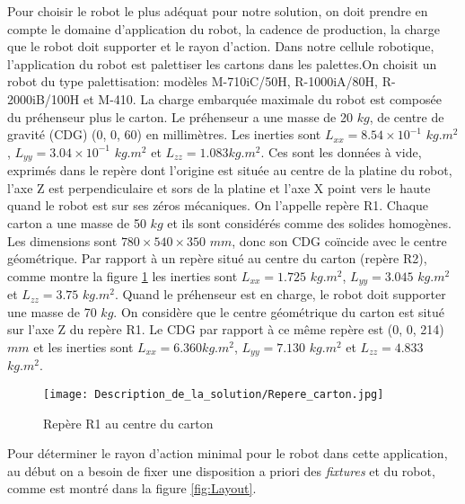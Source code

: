 \vspace{-6pt}


Pour choisir le robot le plus adéquat pour notre solution, on doit prendre en compte le domaine d’application du robot, la cadence de production, la charge que le robot doit supporter et le rayon d’action.
Dans notre cellule robotique, l’application du robot est palettiser les cartons dans les palettes.On choisit un robot du type palettisation: modèles M-710iC/50H, R-1000iA/80H, R-2000iB/100H et M-410.
La charge embarquée maximale du robot est composée du préhenseur plus le carton. Le préhenseur a une masse de 20 $ kg $, de centre de gravité (CDG) (0, 0, 60) en millimètres. Les inerties sont $ L_{xx} = 8.54 \times 10^{-1}$  $ kg.m^2 $, $ L_{yy} = 3.04 \times 10^{-1}$  $ kg.m^2 $ et $ L_{zz} = 1.083 kg.m^2 $. Ces sont les données à vide, exprimés dans le repère dont l'origine est située au centre de la platine du robot, l’axe Z est perpendiculaire et sors de la platine et l’axe X point vers le haute quand le robot est sur ses zéros mécaniques. On l’appelle repère R1.
Chaque carton a une masse de 50 $ kg $ et ils sont considérés comme des solides homogènes. Les dimensions sont $ 780 \times 540 \times 350 $ $ mm $, donc son CDG coïncide avec le centre géométrique. Par rapport à un repère situé au centre du carton (repère R2), comme montre la figure \ref{fig:Repere_carton} les inerties sont $ L_{xx} = 1.725 $  $kg.m^2 $, $ L_{yy} = 3.045$  $ kg.m^2 $ et $ L_{zz} = 3.75$  $ kg.m^2 $.
Quand le préhenseur est en charge, le robot doit supporter une masse de 70 $ kg $. On considère que le centre géométrique du carton est situé sur l’axe Z du repère R1. Le CDG par rapport à ce même repère est (0, 0, 214) $ mm $ et les inerties sont $ L_{xx} = 6.360 kg.m^2 $, $ L_{yy} = 7.130 $  $kg.m^2 $ et $ L_{zz} = 4.833 $  $kg.m^2 $.

\begin{figure}[H]
	\begin{center}	
		\texttt{[image: Description\_de\_la\_solution/Repere\_carton.jpg]}
		\caption{Repère R1 au centre du carton}
		\label{fig:Repere_carton}
	\end{center}
\end{figure}
\pagebreak
Pour déterminer le rayon d’action minimal pour le robot dans cette application, au début on a besoin de fixer une disposition a priori des \textit{fixtures} et du robot, comme est montré dans la figure \ref{fig:Layout}. 

